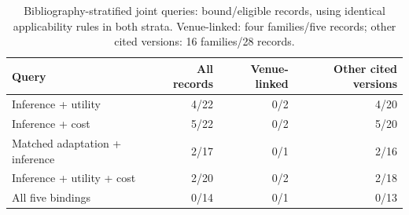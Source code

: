 \begin{table}[ht]\centering\footnotesize
\caption{Bibliography-stratified joint queries: bound/eligible records, using identical applicability rules in both strata. Venue-linked: four families/five records; other cited versions: 16 families/28 records.}\label{tab:r32-publication}
\begin{tabular}{@{}lrrr@{}}\toprule
Query & All records & Venue-linked & Other cited versions\\\midrule
Inference + utility & 4/22 & 0/2 & 4/20\\
Inference + cost & 5/22 & 0/2 & 5/20\\
Matched adaptation + inference & 2/17 & 0/1 & 2/16\\
Inference + utility + cost & 2/20 & 0/2 & 2/18\\
All five bindings & 0/14 & 0/1 & 0/13\\
\bottomrule\end{tabular}\end{table}
